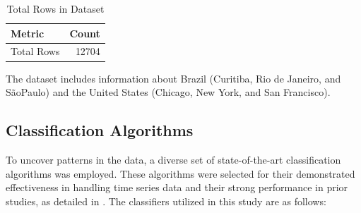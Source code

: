 \documentclass{ieeeaccess}
\begin{document}
\begin{table}[h!]
\centering
\caption{Total Rows in Dataset}
\label{tab:total_rows}
\begin{tabular}{|l|r|}
\hline
\textbf{Metric} & \textbf{Count} \\
\hline
Total Rows  & 12704 \\
\hline
\end{tabular}
\end{table}

The dataset includes information about Brazil (Curitiba, Rio de Janeiro, and SãoPaulo) and the United States (Chicago, New York, and San Francisco).

\subsection{Classification Algorithms}
To uncover patterns in the data, a diverse set of state-of-the-art classification algorithms was employed. These algorithms were selected for their demonstrated effectiveness in handling time series data and their strong performance in prior studies, as detailed in \cite{middlehurst2024bakeoff}. The classifiers utilized in this study are as follows:
\end{document}

